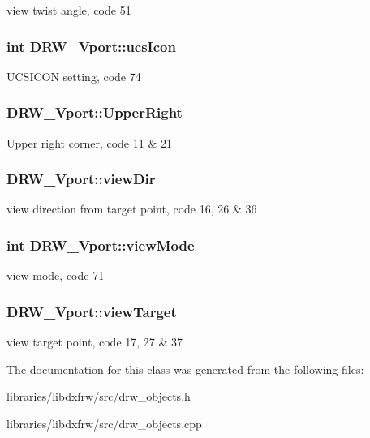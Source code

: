 view twist angle, code 51 \hypertarget{classDRW__Vport_ac3bd19802da31bd4bb9e07255e0bbdc6}{
\subsubsection[{ucs\-Icon}]{\setlength{\rightskip}{0pt plus 5cm}int D\-R\-W\-\_\-\-Vport\-::ucs\-Icon}}\label{classDRW__Vport_ac3bd19802da31bd4bb9e07255e0bbdc6}
U\-C\-S\-I\-C\-O\-N setting, code 74 \hypertarget{classDRW__Vport_ae63541133c20a69a6e13f25191e02b05}{
\subsubsection[{Upper\-Right}]{ D\-R\-W\-\_\-\-Vport\-::\-Upper\-Right}}\label{classDRW__Vport_ae63541133c20a69a6e13f25191e02b05}
Upper right corner, code 11 \& 21 \hypertarget{classDRW__Vport_a657f3b92d041527a5a485dce22c448a1}{
\subsubsection[{view\-Dir}]{ D\-R\-W\-\_\-\-Vport\-::view\-Dir}}\label{classDRW__Vport_a657f3b92d041527a5a485dce22c448a1}
view direction from target point, code 16, 26 \& 36 \hypertarget{classDRW__Vport_ab96feaf67d7eed371e30ffdf04a4a9cb}{
\subsubsection[{view\-Mode}]{\setlength{\rightskip}{0pt plus 5cm}int D\-R\-W\-\_\-\-Vport\-::view\-Mode}}\label{classDRW__Vport_ab96feaf67d7eed371e30ffdf04a4a9cb}
view mode, code 71 \hypertarget{classDRW__Vport_a93eb77539e5ad11990b828074685d85f}{
\subsubsection[{view\-Target}]{ D\-R\-W\-\_\-\-Vport\-::view\-Target}}\label{classDRW__Vport_a93eb77539e5ad11990b828074685d85f}
view target point, code 17, 27 \& 37 

The documentation for this class was generated from the following files\-:\begin{DoxyCompactItemize}
\item 
libraries/libdxfrw/src/drw\-\_\-objects.\-h\item 
libraries/libdxfrw/src/drw\-\_\-objects.\-cpp\end{DoxyCompactItemize}
